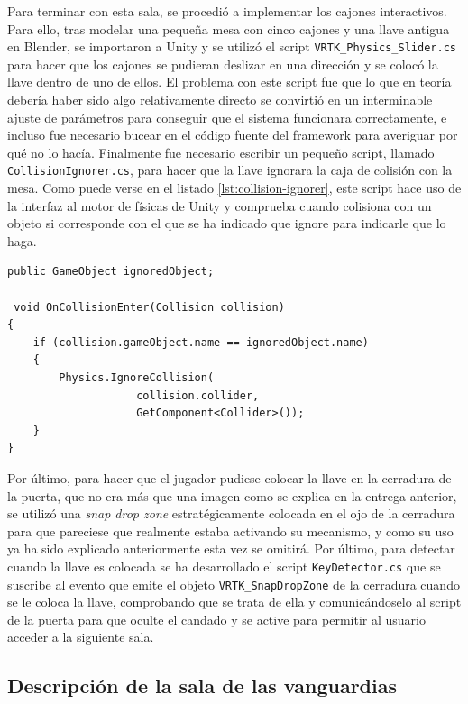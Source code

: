 Para terminar con esta sala, se procedió a implementar los cajones interactivos. Para ello, tras modelar una pequeña mesa con cinco cajones y una llave antigua en Blender, se importaron a Unity y se utilizó el script \texttt{VRTK\_Physics\_Slider.cs} para hacer que los cajones se pudieran deslizar en una dirección y se colocó la llave dentro de uno de ellos. El problema con este script fue que lo que en teoría debería haber sido algo relativamente directo se convirtió en un interminable ajuste de parámetros para conseguir que el sistema funcionara correctamente, e incluso fue necesario bucear en el código fuente del framework para averiguar por qué no lo hacía. Finalmente fue necesario escribir un pequeño script, llamado \texttt{CollisionIgnorer.cs}, para hacer que la llave ignorara la caja de colisión con la mesa. Como puede verse en el listado \ref{lst:collision-ignorer}, este script hace uso de la interfaz al motor de físicas de Unity y comprueba cuando colisiona con un objeto si corresponde con el que se ha indicado que ignore para indicarle que lo haga.

\begin{lstlisting}[caption=Fragmento del script para ignorar colisiones, label=lst:collision-ignorer]
public GameObject ignoredObject;

 void OnCollisionEnter(Collision collision)
{
    if (collision.gameObject.name == ignoredObject.name)
    {
        Physics.IgnoreCollision(
                    collision.collider, 
                    GetComponent<Collider>());
    }
}
\end{lstlisting}

Por último, para hacer que el jugador pudiese colocar la llave en la cerradura de la puerta, que no era más que una imagen como se explica en la entrega anterior, se utilizó una \textit{snap drop zone} estratégicamente colocada en el ojo de la cerradura para que pareciese que realmente estaba activando su mecanismo, y como su uso ya ha sido explicado anteriormente esta vez se omitirá. Por último, para detectar cuando la llave es colocada se ha desarrollado el script \texttt{KeyDetector.cs} que se suscribe al evento que emite el objeto \texttt{VRTK\_SnapDropZone} de la cerradura cuando se le coloca la llave, comprobando que se trata de ella y comunicándoselo al script de la puerta para que oculte el candado y se active para permitir al usuario acceder a la siguiente sala.

\subsection{Descripción de la sala de las vanguardias}

